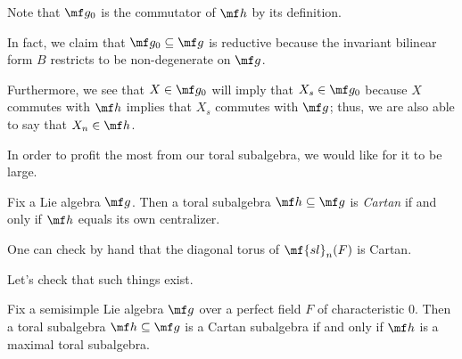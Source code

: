 \documentclass[../notes.tex]{subfiles}
\begin{document}
\begin{remark}
	Note that $\mf g_0$ is the commutator of $\mf h$ by its definition.
\end{remark}
\begin{remark}
	In fact, we claim that $\mf g_0\subseteq\mf g$ is reductive because the invariant bilinear form $B$ restricts to be non-degenerate on $\mf g$.
\end{remark}
\begin{remark}
	Furthermore, we see that $X\in\mf g_0$ will imply that $X_s\in\mf g_0$ because $X$ commutes with $\mf h$ implies that $X_s$ commutes with $\mf g$; thus, we are also able to say that $X_n\in\mf h$.
\end{remark}
In order to profit the most from our toral subalgebra, we would like for it to be large.
\begin{definition}
	Fix a Lie algebra $\mf g$. Then a toral subalgebra $\mf h\subseteq\mf g$ is \textit{Cartan} if and only if $\mf h$ equals its own centralizer.
\end{definition}
\begin{example}
	One can check by hand that the diagonal torus of $\mf{sl}_n(F)$ is Cartan.
\end{example}
Let's check that such things exist.
\begin{lemma}
	Fix a semisimple Lie algebra $\mf g$ over a perfect field $F$ of characteristic $0$. Then a toral subalgebra $\mf h\subseteq\mf g$ is a Cartan subalgebra if and only if $\mf h$ is a maximal toral subalgebra.
\end{lemma}
\end{document}
